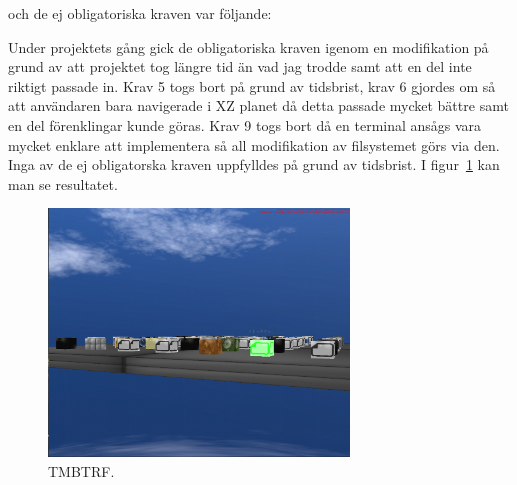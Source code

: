 och de ej obligatoriska kraven var följande:
\begin{LIPSkravlista}
\end{LIPSkravlista}
Under projektets gång gick de obligatoriska kraven igenom en modifikation på grund av att projektet tog längre tid än vad jag trodde samt att en del inte riktigt passade in. Krav 5 togs bort på grund av tidsbrist, krav 6 gjordes om så att användaren bara navigerade i XZ planet då detta passade mycket bättre samt en del förenklingar kunde göras. Krav 9 togs bort då en terminal ansågs vara mycket enklare att implementera så all modifikation av filsystemet görs via den. Inga av de ej obligatorska kraven uppfylldes på grund av tidsbrist. I figur~\ref{fig:tmbtrf} kan man se resultatet. 
\begin{center}
\begin{figure}[H]
    \centering
\includegraphics[width=8cm]{../grafik/tmbtrf.png}
\caption{TMBTRF.}
\label{fig:tmbtrf}
\end{figure}
\end{center}
